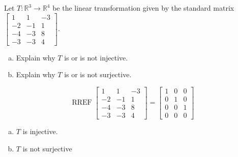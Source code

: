 
\begin{exerciseStatement}
 Let \(T:\mathbb{R}^ 3  \to \mathbb{R}^ 4 \) be the linear transformation given by the standard matrix \( \left[\begin{array}{ccc}
1 & 1 & -3 \\
-2 & -1 & 1 \\
-4 & -3 & 8 \\
-3 & -3 & 4
\end{array}\right] .\)
\begin{enumerate}[(a)]
\item Explain why \(T\) is or is not injective.
\item Explain why \(T\) is or is not surjective.
\end{enumerate}
    
\end{exerciseStatement}
    
\begin{exerciseAnswer} 


\[\operatorname{RREF} \left[\begin{array}{ccc}
1 & 1 & -3 \\
-2 & -1 & 1 \\
-4 & -3 & 8 \\
-3 & -3 & 4
\end{array}\right] = \left[\begin{array}{ccc}
1 & 0 & 0 \\
0 & 1 & 0 \\
0 & 0 & 1 \\
0 & 0 & 0
\end{array}\right] \]


\begin{enumerate}[(a)]
\item \(T\) is injective.
\item \(T\) is not surjective
\end{enumerate}
    
\end{exerciseAnswer}
    

